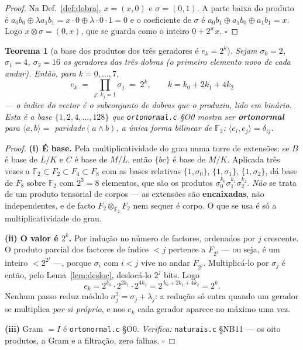 \documentclass[11pt,a4paper]{article}
\newtheorem{teorema}{Teorema}
\newcommand{\code}[1]{\texttt{\small #1}}
\newcommand{\FF}{\mathbb{F}}
\begin{document}
\begin{proof}
Na Def.~\ref{def:dobra}, $x=(x,0)$ e $\sigma=(0,1)$. A parte baixa do produto é
$a_0b_0\oplus\lambda a_1b_1=x\cdot0\oplus\lambda\cdot0\cdot1=0$ e o coeficiente
de $\sigma$ é $a_0b_1\oplus a_1b_0\oplus a_1b_1=x$. Logo
$x\otimes\sigma=(0,x)$, que se guarda como o inteiro $0+2^{w}x$. $\square$
\end{proof}

\begin{teorema}[a base dos produtos dos três geradores é $e_k=2^{k}$]\label{thm:base}
Sejam $\sigma_0=2$, $\sigma_1=4$, $\sigma_2=16$ os geradores das três dobras
(o primeiro elemento novo de cada andar). Então, para $k=0,\ldots,7$,
\[
\boxed{\;e_k\;=\;\prod_{j:\,k_j=1}\sigma_j\;=\;2^{k},
\qquad k=k_0+2k_1+4k_2\;}
\]
--- \emph{o índice do vector é o subconjunto de dobras que o produziu, lido em
binário}. Esta é a base $\{1,2,4,\ldots,128\}$ que \code{ortonormal.c} §O0
mostra ser \textbf{ortonormal} para $\langle a,b\rangle=$ paridade$(a\wedge b)$,
a única forma bilinear de $\FF_2$: $\langle e_i,e_j\rangle=\delta_{ij}$.
\end{teorema}

\begin{proof}
\textbf{(i) É base.} Pela multiplicatividade do grau numa torre de extensões:
se $B$ é base de $L/K$ e $C$ é base de $M/L$, então $\{bc\}$ é base de $M/K$.
Aplicada três vezes a
$\FF_2\subset F_2\subset F_4\subset F_8$ com as bases relativas
$\{1,\sigma_0\}$, $\{1,\sigma_1\}$, $\{1,\sigma_2\}$, dá base de $F_8$ sobre
$\FF_2$ com $2^{3}=8$ elementos, que são os produtos
$\sigma_0^{k_0}\sigma_1^{k_1}\sigma_2^{k_2}$.
\emph{Não} se trata de um produto tensorial de corpos --- as extensões são
\textbf{encaixadas}, não independentes, e de facto
$F_2\otimes_{\FF_2}F_2$ nem sequer é corpo. O que se usa é só a
multiplicatividade do grau.

\textbf{(ii) O valor é $2^{k}$.} Por indução no número de factores, ordenados
por $j$ crescente. O produto parcial dos factores de índice $<j$ pertence a
$F_{2^{j}}$ --- ou seja, é um inteiro $<2^{2^{j}}$ ---, porque $\sigma_i$ com
$i<j$ vive no andar $F_{2^{j}}$. Multiplicá-lo por $\sigma_j$ é então, pelo
Lema~\ref{lem:desloc}, deslocá-lo $2^{j}$ bits. Logo
\[
e_k=2^{k_0}\cdot2^{2k_1}\cdot2^{4k_2}=2^{\,k_0+2k_1+4k_2}=2^{k}.
\]
Nenhum passo reduz módulo $\sigma_j^2=\sigma_j+\lambda_j$: a redução só entra
quando um gerador se multiplica \emph{por si próprio}, e nos $e_k$ cada
gerador aparece no máximo uma vez.

\textbf{(iii)} Gram $=I$ é \code{ortonormal.c} §O0.
\emph{Verifica:} \code{naturais.c} §NB11 --- os oito produtos, a Gram e a
filtração, zero falhas. $\square$
\end{proof}
\end{document}
